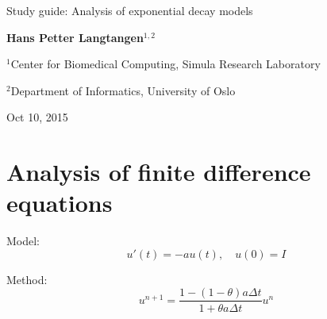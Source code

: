 \documentclass[%
oneside,                 %
final,                   %
10pt]{article}
\begin{document}







\thispagestyle{empty}

\begin{center}
{\LARGE\bf
\begin{spacing}{1.25}
Study guide: Analysis of exponential decay models
\end{spacing}
}
\end{center}


\begin{center}
{\bf Hans Petter Langtangen${}^{1, 2}$} \\ [0mm]
\end{center}

\begin{center}
\centerline{{\small ${}^1$Center for Biomedical Computing, Simula Research Laboratory}}
\centerline{{\small ${}^2$Department of Informatics, University of Oslo}}
\end{center}
    

\begin{center}
Oct 10, 2015
\end{center}

\vspace{1cm}


\section*{Analysis of finite difference equations}
\label{decay:analysis}

Model:
\begin{equation}
u'(t) = -au(t),\quad u(0)=I
\end{equation}

Method:
\begin{equation}
u^{n+1} = \frac{1 - (1-\theta) a\Delta t}{1 + \theta a\Delta t}u^n
\label{decay:analysis:scheme}
\end{equation}


\end{document}
